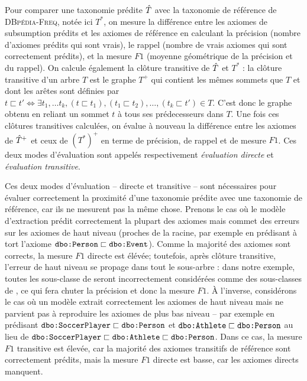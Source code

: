 Pour comparer une taxonomie prédite $\hat{T}$ avec la taxonomie de référence de \textsc{DBpédia-Freq}, notée ici $T^*$, on mesure la différence entre les axiomes de subsumption prédits et les axiomes de référence en calculant la précision (nombre d'axiomes prédits qui sont vrais), le rappel (nombre de vrais axiomes qui sont correctement prédits), et la mesure $F1$ (moyenne géométrique de la précision et du rappel). On calcule également la clôture transitive de $\hat{T}$ et $T^*$ : la clôture transitive d'un arbre $T$ est le graphe $T^+$ qui contient les mêmes sommets que $T$ et dont les arêtes sont définies par $t \sqsubset t' \iff \exists t_1, \ldots t_k, (t \sqsubset t_1), (t_1 \sqsubset t_2), \ldots, (t_k \sqsubset t') \in T$. C'est donc le graphe obtenu en reliant un sommet $t$ à tous ses prédecesseurs dans $T$. Une fois ces clôtures transitives calculées, on évalue à nouveau la différence entre les axiomes de $\hat{T}^+$ et ceux de $(T^*)^+$ en terme de précision, de rappel et de mesure $F1$. Ces deux modes d'évaluation sont appelés respectivement \textit{évaluation directe} et \textit{évaluation transitive}.

Ces deux modes d'évaluation – directe et transitive – sont nécessaires pour évaluer correctement la proximité d'une taxonomie prédite avec une taxonomie de référence, car ils ne mesurent pas la même chose. Prenons le cas où le modèle d'extraction prédit correctement la plupart des axiomes mais commet des erreurs sur les axiomes de haut niveau (proches de la racine, par exemple en prédisant à tort l'axiome $\texttt{dbo:Person} \sqsubset \texttt{dbo:Event}$). Comme la majorité des axiomes sont corrects, la mesure $F1$ directe est élévée; toutefois, après clôture transitive, l'erreur de haut niveau se propage dans tout le sous-arbre : dans notre exemple, toutes les sous-classe de  seront incorrectement considérées comme des sous-classes de , ce qui fera chuter la précision et donc la mesure $F1$. À l'inverse, considérons le cas où un modèle extrait correctement les axiomes de haut niveau mais ne parvient pas à reproduire les axiomes de plus bas niveau – par exemple en prédisant $\texttt{dbo:SoccerPlayer} \sqsubset \texttt{dbo:Person}$ et $\texttt{dbo:Athlete} \sqsubset \texttt{dbo:Person}$ au lieu de $\texttt{dbo:SoccerPlayer} \sqsubset \texttt{dbo:Athlete} \sqsubset \texttt{dbo:Person}$. Dans ce cas, la mesure $F1$ transitive est élevée, car la majorité des axiomes transitifs de référence sont correctement prédits, mais la mesure $F1$ directe est basse, car les axiomes directs manquent. %


